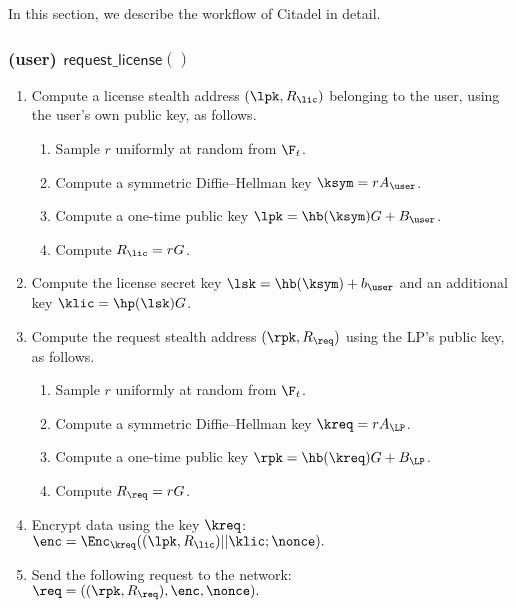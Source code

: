 

In this section, we describe the workflow of Citadel in detail.

\subsubsection{(\textbf{user}) $\mathsf{request\_license}()$}

\begin{enumerate}
	
	\item Compute a license stealth address $(\lpk, R_{\lic})$ belonging to the user, using the user's own public key, as follows.
	
	\begin{enumerate}
		\item Sample $r$ uniformly at random from $\F_t$.
		\item Compute a symmetric Diffie--Hellman key $\ksym = rA_{\user}$.
		\item Compute a one-time public key $\lpk = \hb(\ksym)G + B_{\user}$.
		\item Compute $R_{\lic} = rG$.
	\end{enumerate}
	
	\item Compute the license secret key $\lsk = \hb(\ksym) + b_{\user}$ and an additional key $\klic = \hp(\lsk)G$. 
	
	\item Compute the request stealth address $(\rpk, R_{\req})$ using the LP's public key, as follows.
	
	\begin{enumerate}
		\item Sample $r$ uniformly at random from $\F_t$.
		\item Compute a symmetric Diffie--Hellman key $\kreq = rA_{\LP}$.
		\item Compute a one-time public key $\rpk = \hb(\kreq)G + B_{\LP}$.
		\item Compute $R_{\req} = rG$.
	\end{enumerate}
	
	\item Encrypt data using the key $\kreq$: $\enc = \Enc_{\kreq} ((\lpk, R_{\lic})||\klic; \nonce).$
	
	
	\item Send the following request to the network: $\req = ((\rpk, R_{\req}), \enc, \nonce).$
	
\end{enumerate}


